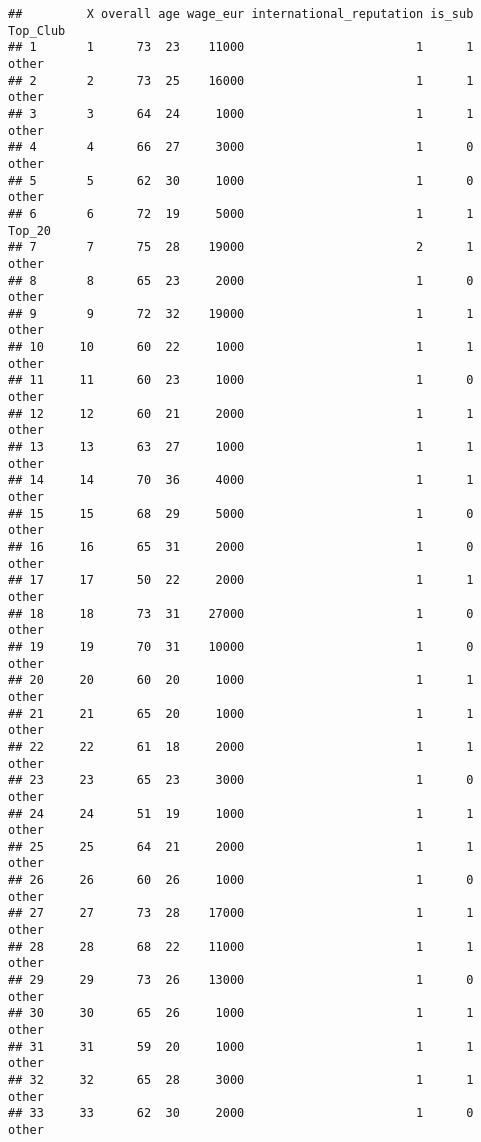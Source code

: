 \documentclass[
]{article}
\begin{document}
\begin{verbatim}
##         X overall age wage_eur international_reputation is_sub Top_Club
## 1       1      73  23    11000                        1      1    other
## 2       2      73  25    16000                        1      1    other
## 3       3      64  24     1000                        1      1    other
## 4       4      66  27     3000                        1      0    other
## 5       5      62  30     1000                        1      0    other
## 6       6      72  19     5000                        1      1   Top_20
## 7       7      75  28    19000                        2      1    other
## 8       8      65  23     2000                        1      0    other
## 9       9      72  32    19000                        1      1    other
## 10     10      60  22     1000                        1      1    other
## 11     11      60  23     1000                        1      0    other
## 12     12      60  21     2000                        1      1    other
## 13     13      63  27     1000                        1      1    other
## 14     14      70  36     4000                        1      1    other
## 15     15      68  29     5000                        1      0    other
## 16     16      65  31     2000                        1      0    other
## 17     17      50  22     2000                        1      1    other
## 18     18      73  31    27000                        1      0    other
## 19     19      70  31    10000                        1      0    other
## 20     20      60  20     1000                        1      1    other
## 21     21      65  20     1000                        1      1    other
## 22     22      61  18     2000                        1      1    other
## 23     23      65  23     3000                        1      0    other
## 24     24      51  19     1000                        1      1    other
## 25     25      64  21     2000                        1      1    other
## 26     26      60  26     1000                        1      0    other
## 27     27      73  28    17000                        1      1    other
## 28     28      68  22    11000                        1      1    other
## 29     29      73  26    13000                        1      0    other
## 30     30      65  26     1000                        1      1    other
## 31     31      59  20     1000                        1      1    other
## 32     32      65  28     3000                        1      1    other
## 33     33      62  30     2000                        1      0    other

\end{verbatim}
\end{document}

